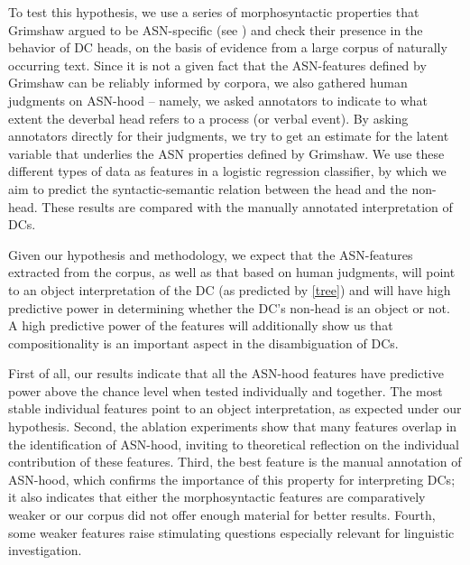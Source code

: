\documentclass[output=paper]{langsci/langscibook}
\begin{document}
To test this hypothesis, we  use a series of morphosyntactic properties that Grimshaw argued to be ASN-specific (see )  and check their presence in the behavior of DC heads, on the basis of evidence from a large corpus of naturally occurring text.   Since it is not a given fact that the ASN-features defined by Grimshaw can be reliably informed by corpora, we also gathered human judgments on ASN-hood -- namely, we asked annotators to indicate to what extent the deverbal head refers to a process (or verbal event). By asking annotators directly for their judgments, we try to get an estimate for the latent variable that underlies the ASN properties defined by Grimshaw. We use these different types of data as features in a logistic regression classifier, by which we aim to predict the syntactic-semantic relation between the head and the non-head.  These results are compared with the manually annotated interpretation of DCs. 
 

Given our hypothesis and methodology, we expect that the ASN-features extracted from the corpus, as well as that based on human judgments, will point to an object interpretation of the DC (as predicted by \ref{tree}) and will have high predictive power in determining whether the DC's non-head is an object or not. A high predictive power of the features will additionally show us that compositionality is an important aspect in the disambiguation of DCs.

First of all, our results indicate that all the ASN-hood features have predictive power above the chance level when tested individually and  together. The most stable individual features point to an object interpretation, as expected under our hypothesis. Second, the ablation experiments  show that many features overlap in the identification of ASN-hood, inviting to theoretical reflection on  the individual contribution of these features. Third, the best feature is the manual annotation of ASN-hood,  which confirms the importance of this property for interpreting DCs;  it also indicates that either the morphosyntactic features are comparatively weaker or our corpus did not offer enough material for better results. Fourth, some weaker features raise stimulating questions especially relevant for linguistic investigation.\largerpage
\end{document}
